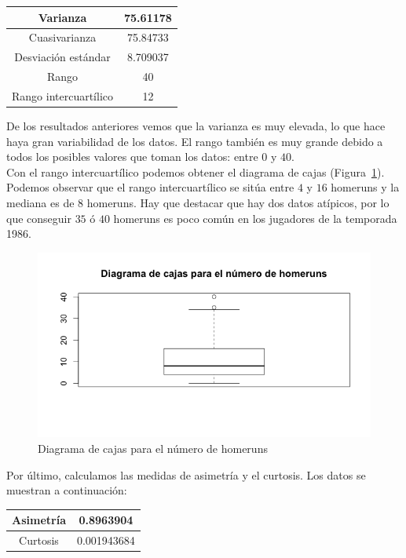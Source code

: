 \documentclass[12pt,a4paper,twoside,openright,titlepage,final]{article}
\begin{document}
\begin{table}[htbp]
\centering
\begin{tabular}{|c|c|}
\hline Varianza & 75.61178 \\ 
\hline Cuasivarianza & 75.84733 \\
\hline Desviación estándar & 8.709037 \\  
\hline Rango & 40  \\ 
\hline Rango intercuartílico & 12  \\ 
\hline 
\end{tabular} 
\end{table}

De los resultados anteriores vemos que la varianza es muy elevada, lo que hace haya gran variabilidad de los datos. El rango también es muy grande debido a todos los posibles valores que toman los datos: entre $0$ y $40$.\\

Con el rango intercuartílico podemos obtener el diagrama de cajas (Figura~\ref{fig:diagrama_cajas_homeruns}). Podemos observar que el rango intercuartílico se sitúa entre $4$ y $16$ homeruns y la mediana es de $8$ homeruns. Hay que destacar que hay dos datos atípicos, por lo que conseguir $35$ ó $40$ homeruns es poco común en los jugadores de la temporada 1986.\\

\begin{figure}[tbph!]
\centering
\includegraphics[width=0.8\linewidth]{imagenes/diagrama_cajas_homeruns}
\caption{Diagrama de cajas para el número de homeruns}
\label{fig:diagrama_cajas_homeruns}
\end{figure}

Por último, calculamos las medidas de asimetría y el curtosis. Los datos se muestran a continuación:

\begin{table}[htbp]
\centering
\begin{tabular}{|c|c|}
\hline Asimetría & 0.8963904 \\ 
\hline Curtosis & 0.001943684 \\
\hline 
\end{tabular} 
\end{table}
\end{document}
